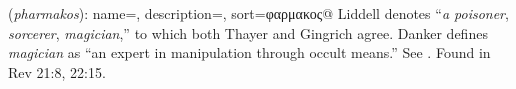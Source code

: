 \item[Magician,]

(\textit{pharmakos}):
{
    name=,
    description={},
    sort=φαρμακος@
}
Liddell denotes ``\emph{a poisoner}, \emph{sorcerer}, \emph{magician},'' to which both Thayer and Gingrich agree. Danker defines \emph{magician} as ``an expert in manipulation through occult means.'' See .
Found in Rev 21:8, 22:15.
